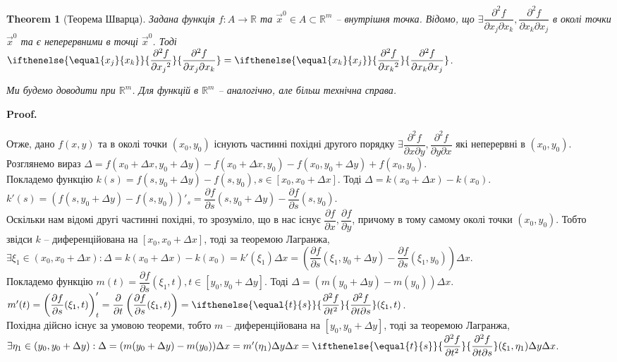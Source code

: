 \documentclass[a4paper, 10pt]{article}
\makeatletter
\def\departial#1#2{\dfrac{\partial {#1}}{\partial {#2}}}
\def\seconddepartial#1#2#3{\ifthenelse{\equal{#2}{#3}}{\dfrac{\partial^2 {#1}}{\partial {#2}^2}}{\dfrac{\partial^2 {#1}}{\partial {#2} \partial {#3}}}}
\theoremstyle{theoremdd}
\newtheorem{theorem}{Theorem}[subsection]
\theoremstyle{theoremdd}
\theoremstyle{theoremdd}
\theoremstyle{theoremdd}
\theoremstyle{theoremdd}
\theoremstyle{theoremdd}
\theoremstyle{theoremdd}
\theoremstyle{theoremdd}
\theoremstyle{theoremdd}
\renewenvironment{proof}[1][Proof.\\]{\par
\pushQED{\hfill \qed}%
\normalfont \topsep6\p@\@plus6\p@\relax
\trivlist
\item\relax
{\bfseries
#1\@addpunct{.}}\hspace\labelsep\ignorespaces
}{%
\popQED\endtrivlist\@endpefalse
}
\makeatother
\begin{document}
\begin{theorem}[Теорема Шварца]
Задана функція $f\colon A \to \mathbb{R}$ та $\vec{x}^0 \in A \subset \mathbb{R}^m$ -- внутрішня точка. Відомо, що $\exists \dfrac{\partial^2 f}{\partial x_j \partial x_k}, \dfrac{\partial^2 f}{\partial x_k \partial x_j}$ в околі точки $\vec{x}^0$ та є неперервними в точці $\vec{x}^0$. Тоді $\seconddepartial{f}{x_j}{x_k} = \seconddepartial{f}{x_k}{x_j}$.
\end{theorem}

\textit{Ми будемо доводити при $\mathbb{R}^m$. Для функцій в $\mathbb{R}^m$ -- аналогічно, але більш технічна справа.}

\begin{proof}
Отже, дано $f(x,y)$ та в околі точки $(x_0,y_0)$ існують частинні похідні другого порядку $\exists \dfrac{\partial^2 f}{\partial x \partial y}, \dfrac{\partial^2 f}{\partial y \partial x}$ які неперервні в $(x_0,y_0)$.\\
Розглянемо вираз $\Delta = f(x_0+\Delta x, y_0+\Delta y) - f(x_0+\Delta x,y_0) - f(x_0,y_0+\Delta y) + f(x_0,y_0)$.\\
Покладемо функцію $k(s) = f(s,y_0+\Delta y) - f(s,y_0), s \in [x_0,x_0+\Delta x]$. Тоді $\Delta = k(x_0+\Delta x) - k(x_0)$.\\
$k'(s) = (f(s,y_0+\Delta y) - f(s,y_0))'_s = \departial{f}{s}(s,y_0+\Delta y) - \departial{f}{s}(s,y_0)$.\\
Оскільки нам відомі другі частинні похідні, то зрозуміло, що в нас існує $\departial{f}{x}, \departial{f}{y}$, причому в тому самому околі точки $(x_0,y_0)$. Тобто звідси $k$ -- диференційована на $[x_0, x_0+\Delta x]$, тоді за теоремою Лагранжа, $\exists \xi_1 \in (x_0,x_0+\Delta x): \Delta = k(x_0+\Delta x) - k(x_0) = k'(\xi_1) \Delta x = \left( \departial{f}{s}(\xi_1,y_0+\Delta y) - \departial{f}{s}(\xi_1,y_0) \right) \Delta x$.\\
Покладемо функцію $m(t) = \departial{f}{s}(\xi_1,t), t \in [y_0,y_0+\Delta y]$. Тоді $\Delta = (m(y_0+\Delta y) - m(y_0)) \Delta x$.\\
$m'(t) = \left( \departial{f}{s}(\xi_1,t) \right)'_t = \departial{}{t}\left( \departial{f}{s}(\xi_1,t) \right) = \seconddepartial{f}{t}{s}(\xi_1,t)$.\\
Похідна дійсно існує за умовою теореми, тобто $m$ -- диференційована на $[y_0,y_0+\Delta y]$, тоді за теоремою Лагранжа, $\exists \eta_1 \in (y_0,y_0+\Delta y): \Delta = (m(y_0+\Delta y)-m(y_0)) \Delta x = m'(\eta_1) \Delta y \Delta x = \seconddepartial{f}{t}{s}(\xi_1,\eta_1) \Delta y \Delta x$.

\end{proof}
\end{document}
